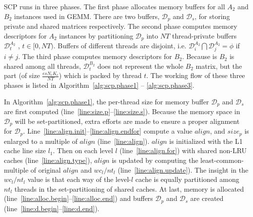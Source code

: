SCP runs in three phases.
The first phase allocates memory buffers for all $A_2$ and $B_2$
instances used in GEMM. There are two buffers, $\mathcal{D}_p$ and $\mathcal{D}_s$,
for storing private and shared matrices respectively.
The second phase computes memory descriptors for $A_2$ instances
by partitioning $\mathcal{D}_p$ into $NT$ thread-private buffers
$\mathcal{D}_t^{A_2}$ , $t \in [0, NT)$.
Buffers of different threads are disjoint,
i.e. $\mathcal{D}_i^{A_2} \bigcap \mathcal{D}_j^{A_2} = \phi$ if $i \ne j$.
The third phase computes memory descriptors for $B_2$.
Because is $B_2$ is shared among all threads,
$\mathcal{D}_t^{B_2}$ does not represent the whole $B_2$ matrix,
but the part (of size $\frac{es N_c K_c}{NT}$) which is packed by thread $t$.
The working flow of these three phases is listed
in Algorithm~\ref{alg:scp.phase1} -- \ref{alg:scp.phase3}.

In Algorithm~\ref{alg:scp.phase1},
the per-thread size for memory buffer $\mathcal{D}_p$ and
$\mathcal{D}_s$ are first computed
(line~\ref{line:size.p}--\ref{line:size.s}).
Because the memory space in $\mathcal{D}_p$ will be set-partitioned,
extra efforts are made to ensure a proper alignment for $\mathcal{D}_p$.
Line~\ref{line:align.init}--\ref{line:align.endfor} compute a value $align$,
and $size_p$ is enlarged to a multiple of $align$ (line~\ref{line:align}).
$align$ is initialized with the L1 cache line size $l_1$.
Then on each level $l$ (line~\ref{line:align.for})
with shared non-LRU caches (line~\ref{line:align.type}),
$align$ is updated by computing the least-common-multiple of
original $align$ and $wc_l/nt_l$ (line~\ref{line:align.update}).
The insight in the $wc_l/nt_l$ value is that
each way of the level-$l$ cache is equally partitioned among $nt_l$ threads
in the set-partitioning of shared caches.
At last, memory is allocated (line~\ref{line:alloc.begin}--\ref{line:alloc.end})
and buffers $\mathcal{D}_p$ and $\mathcal{D}_s$
are created (line~\ref{line:d.begin}--\ref{line:d.end}).

